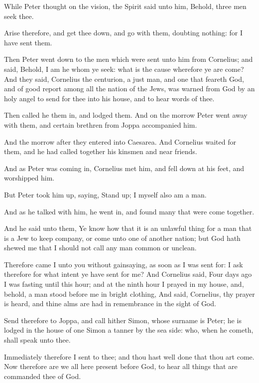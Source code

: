 \Verse While Peter thought on the vision, the Spirit said unto him, Behold, three men seek thee.

\Verse Arise therefore, and get thee down, and go with them, doubting nothing: for I have sent them.

\Verse Then Peter went down to the men which were sent unto him from Cornelius; and said, Behold, I am he whom ye seek: what is the cause wherefore ye are come?  \Verse And they said, Cornelius the centurion, a just man, and one that feareth God, and of good report among all the nation of the Jews, was warned from God by an holy angel to send for thee into his house, and to hear words of thee.

\Verse Then called he them in, and lodged them. And on the morrow Peter went away with them, and certain brethren from Joppa accompanied him.

\Verse And the morrow after they entered into Caesarea. And Cornelius waited for them, and he had called together his kinsmen and near friends.

\Verse And as Peter was coming in, Cornelius met him, and fell down at his feet, and worshipped him.

\Verse But Peter took him up, saying, Stand up; I myself also am a man.

\Verse And as he talked with him, he went in, and found many that were come together.

\Verse And he said unto them, Ye know how that it is an unlawful thing for a man that is a Jew to keep company, or come unto one of another nation; but God hath shewed me that I should not call any man common or unclean.

\Verse Therefore came I unto you without gainsaying, as soon as I was sent for: I ask therefore for what intent ye have sent for me?  \Verse And Cornelius said, Four days ago I was fasting until this hour; and at the ninth hour I prayed in my house, and, behold, a man stood before me in bright clothing, \Verse And said, Cornelius, thy prayer is heard, and thine alms are had in remembrance in the sight of God.

\Verse Send therefore to Joppa, and call hither Simon, whose surname is Peter; he is lodged in the house of one Simon a tanner by the sea side: who, when he cometh, shall speak unto thee.

\Verse Immediately therefore I sent to thee; and thou hast well done that thou art come. Now therefore are we all here present before God, to hear all things that are commanded thee of God.

